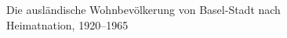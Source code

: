 \documentclass[
  letterpaper,
  DIV=11,
  numbers=noendperiod]{scrartcl}
\begin{document}
\begin{figure}


\caption{\label{fig-die-auslaendische-wohnbevoelkerung-von-basel-stadt-nach-heimatnation-1920-1965}Die
ausländische Wohnbevölkerung von Basel-Stadt nach Heimatnation,
1920--1965}

\end{figure}%
\end{document}
